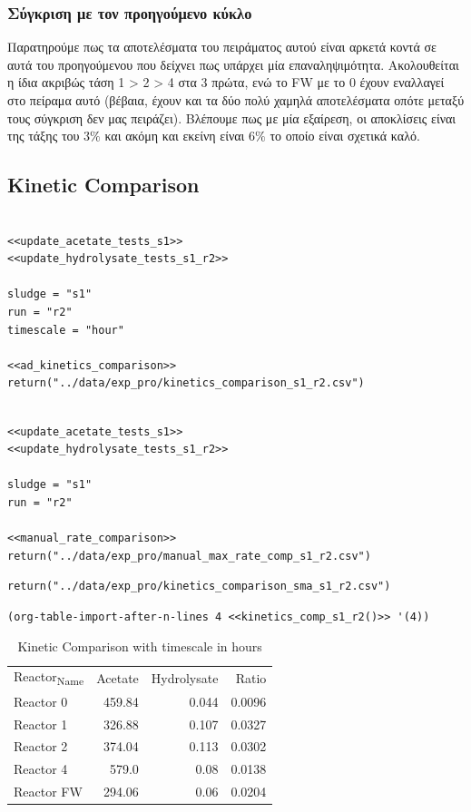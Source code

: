 \documentclass[11pt]{article}
\begin{document}
\subsubsection{Σύγκριση με τον προηγούμενο κύκλο}
\label{sec:org8246f56}
Παρατηρούμε πως τα αποτελέσματα του πειράματος αυτού είναι αρκετά κοντά σε αυτά του προηγούμενου που δείχνει πως υπάρχει μία επαναληψιμότητα. Ακολουθείται η ίδια ακριβώς τάση 1 > 2 > 4 στα 3 πρώτα, ενώ το FW με το 0 έχουν εναλλαγεί στο πείραμα αυτό (βέβαια, έχουν και τα δύο πολύ χαμηλά αποτελέσματα οπότε μεταξύ τους σύγκριση δεν μας πειράζει). Βλέπουμε πως με μία εξαίρεση, οι αποκλίσεις είναι της τάξης του \(3 \%\) και ακόμη και εκείνη είναι \(6 \%\) το οποίο είναι σχετικά καλό. 

\subsection{Kinetic Comparison}
\label{sec:org78e16db}
\begin{verbatim}

<<update_acetate_tests_s1>>
<<update_hydrolysate_tests_s1_r2>>

sludge = "s1"
run = "r2"
timescale = "hour"

<<ad_kinetics_comparison>>
return("../data/exp_pro/kinetics_comparison_s1_r2.csv")
\end{verbatim}

\begin{verbatim}

<<update_acetate_tests_s1>>
<<update_hydrolysate_tests_s1_r2>>

sludge = "s1"
run = "r2"

<<manual_rate_comparison>>
return("../data/exp_pro/manual_max_rate_comp_s1_r2.csv")

\end{verbatim}

\begin{verbatim}
return("../data/exp_pro/kinetics_comparison_sma_s1_r2.csv")
\end{verbatim}

\begin{verbatim}
(org-table-import-after-n-lines 4 <<kinetics_comp_s1_r2()>> '(4))
\end{verbatim}

\begin{table}[htbp]
\caption{Kinetic Comparison with timescale in hours}
\centering
\begin{tabular}{lrrr}
Reactor\textsubscript{Name} & Acetate & Hydrolysate & Ratio\\[0pt]
Reactor 0 & 459.84 & 0.044 & 0.0096\\[0pt]
Reactor 1 & 326.88 & 0.107 & 0.0327\\[0pt]
Reactor 2 & 374.04 & 0.113 & 0.0302\\[0pt]
Reactor 4 & 579.0 & 0.08 & 0.0138\\[0pt]
Reactor FW & 294.06 & 0.06 & 0.0204\\[0pt]
\end{tabular}
\end{table}
\end{document}
